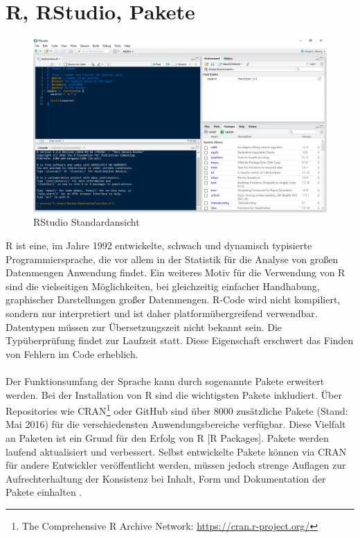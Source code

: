 \section{R, RStudio, Pakete}
\label{kapitel:R}
\begin{figure}[!t]
\centering
\includegraphics[width=\textwidth]{abbildungen/rstudio}
\caption{RStudio Standardansicht}
\label{abb:rstudio}
\end{figure}
R ist eine, im Jahre 1992 entwickelte, schwach und dynamisch typisierte Programmiersprache, die vor allem in der Statistik für die Analyse von großen Datenmengen Anwendung findet. Ein weiteres Motiv für die Verwendung von R sind die vielseitigen Möglichkeiten, bei gleichzeitig einfacher Handhabung, graphischer Darstellungen großer Datenmengen. R-Code wird nicht kompiliert, sondern nur interpretiert und ist daher platformübergreifend verwendbar. Datentypen müssen zur Übersetzungszeit nicht bekannt sein. Die Typüberprüfung findet zur Laufzeit statt. Diese Eigenschaft erschwert das Finden von Fehlern im Code erheblich.
\\
\\
Der Funktionsumfang der Sprache kann durch sogenannte Pakete erweitert werden. Bei der Installation von R sind die wichtigsten Pakete inkludiert. Über Repositories wie CRAN\footnote{The Comprehensive R Archive Network: \url{https://cran.r-project.org/}} oder GitHub sind über 8000 zusätzliche Pakete (Stand: Mai 2016) für die verschiedensten Anwendungsbereiche verfügbar. Diese Vielfalt an Paketen ist ein Grund für den Erfolg von R [R Packages]. Pakete werden laufend aktualisiert und verbessert. Selbst entwickelte Pakete können via CRAN für andere Entwickler veröffentlicht werden, müssen jedoch strenge Auflagen zur Aufrechterhaltung der Konsistenz bei Inhalt, Form und Dokumentation der Pakete einhalten \cite{rmanual}.  
